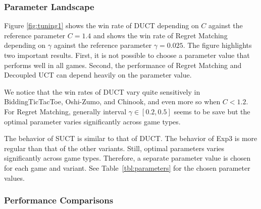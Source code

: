 \documentclass[conference]{IEEEtran}
\begin{document}
\subsubsection{Parameter Landscape}

Figure \ref{fig:tuning1} shows the win rate of DUCT depending on $C$ against the reference parameter $C=1.4$ and 
shows the win rate of Regret Matching depending on $\gamma$ against the reference parameter $\gamma = 0.025$. The figure 
highlights two important results. First, it is not possible to choose a parameter value that performs well in all games. 
Second, the performance of Regret Matching and Decoupled UCT can depend heavily on the parameter value. 

We notice that the win rates of DUCT vary quite sensitively in BiddingTicTacToe, Oshi-Zumo, and Chinook, and even more so when $C < 1.2$. 
For Regret Matching, generally interval $\gamma \in [0.2,0.5]$ seems to be save but the optimal parameter varies significantly across game types.

The behavior of SUCT is similar to that of DUCT. The behavior of Exp3 is more regular than that of the other variants. 
Still, optimal parameters varies significantly across game types. Therefore, a separate parameter value is chosen 
for each game and variant. See Table~\ref{tbl:parameters} for the chosen parameter values.


\subsubsection{Performance Comparisons}
\end{document}
